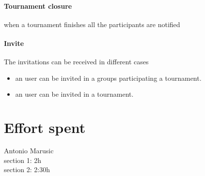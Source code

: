 \documentclass{article}
\newcommand{\participants}{participants }
\newcommand{\group}{groups }
\newcommand{\user}{user }
\begin{document}
                \paragraph{Tournament closure}
                    when a tournament finishes all the \participants are notified

                \paragraph*{Invite}
                    The invitations can be received in different cases
                    \begin {itemize}
                        \item an \user can be invited in a \group participating a tournament.
                        \item an user can be invited in a tournament.

                    \end {itemize}

\section{Effort spent}
    Antonio Marusic\\
    section 1: 2h\\
    section 2: 2:30h\\


    
\end{document}
